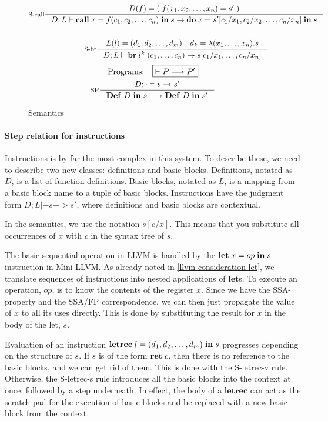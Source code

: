 \documentclass[a4paper, oneside, 10pt, draft]{memoir}
\begin{document}
\begin{figure}
\begin{gather*}
    \inference[S-call]{D(f) = (\;f(x_1, x_2, \dotsc, x_n) = s'\;)}{D;L |-
      \icall{x}{f}{(c_1, c_2, \dotsc, c_n)}{s} -> \ido{x}{s'[c_1/x_1, c_2/x_2,
        \dotsc, c_n/x_n]}{s}}\\\\
    \inference[S-br]{L(l) = \dbundle \quad d_k = \lambda(x_1, \dotsc,
      x_n).s}{D;L |- \ibr{l^k}{(c_1, \dotsc, c_n)} -> s[c_1/x_1, \dotsc, c_n/x_n]}
 \end{gather*}
 \begin{gather*}
   \text{Programs:} \quad \boxed{|- P --> P'}\\
   \inference[SP]{D;\cdot |- s -> s'}{\ipgm{D}{s} --> \ipgm{D}{s'}}
 \end{gather*}
  \caption{Semantics}
  \label{fig:semantics}
\end{figure}

\paragraph{Step relation for instructions}

Instructions is by far the most complex in this system. To describe
these, we need to describe two new classes: definitions and basic
blocks. Definitions, notated as $D$, is a list of function
definitions. Basic blocks, notated as $L$, is a mapping from a basic
block name to a tuple of basic blocks. Instructions have the
judgment form $\boxed{D;L |- s -> s'}$, where definitions and basic
blocks are contextual.

In the semantics, we use the notation $s[c/x]$. This means that you
substitute all occurrences of $x$ with $c$ in the syntax tree of
$s$.

The basic sequential operation in LLVM is handled by the
$\mathbf{let} \; x = op \; \mathbf{in} \; s$ instruction in Mini-LLVM. As already noted in
\ref{llvm-consideration-let}, we translate sequences of instructions
into nested applications of $\mathbf{let}$s. To execute an operation,
$op$, is to know the contents of the register $x$. Since we have the
SSA-property and the SSA/FP correspondence, we can then just propagate
the value of $x$ to all its uses directly. This is done by
substituting the result for $x$ in the body of the let, $s$.

Evaluation of an instruction $\mathbf{letrec} \; l = (d_1, d_2, \dotsc, d_m) \; \mathbf{in} \; s$ progresses
depending on the structure of $s$. If $s$ is of the form $\mathbf{ret} \; c$,
then there is no reference to the basic blocks, and we can get rid of
them. This is done with the S-letrec-v rule. Otherwise, the S-letrec-s
rule introduces all the basic blocks into the context at once;
followed by a step underneath.  In effect, the body of a
$\mathbf{letrec}$ can act as the scratch-pad for the execution of
basic blocks and be replaced with a new basic block from the context.
\end{document}
